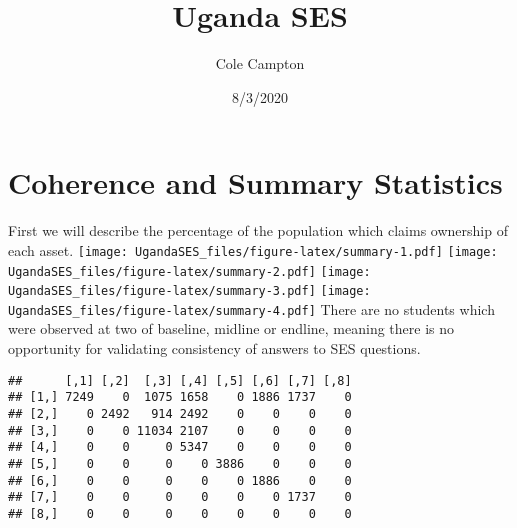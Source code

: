 \documentclass[
]{article}
\title{Uganda SES}
\author{Cole Campton}
\date{8/3/2020}
\newenvironment{Shaded}{\begin{snugshade}}{\end{snugshade}}
\newcommand{\ControlFlowTok}[1]{\textcolor[rgb]{0.13,0.29,0.53}{\textbf{#1}}}
\newcommand{\DataTypeTok}[1]{\textcolor[rgb]{0.13,0.29,0.53}{#1}}
\newcommand{\DecValTok}[1]{\textcolor[rgb]{0.00,0.00,0.81}{#1}}
\newcommand{\KeywordTok}[1]{\textcolor[rgb]{0.13,0.29,0.53}{\textbf{#1}}}
\newcommand{\NormalTok}[1]{#1}
\newcommand{\OperatorTok}[1]{\textcolor[rgb]{0.81,0.36,0.00}{\textbf{#1}}}
\newcommand{\StringTok}[1]{\textcolor[rgb]{0.31,0.60,0.02}{#1}}
\begin{document}
\maketitle

\hypertarget{coherence-and-summary-statistics}{%
\section{Coherence and Summary
Statistics}\label{coherence-and-summary-statistics}}

First we will describe the percentage of the population which claims
ownership of each asset.
\texttt{[image: UgandaSES\_files/figure-latex/summary-1.pdf]}
\texttt{[image: UgandaSES\_files/figure-latex/summary-2.pdf]}
\texttt{[image: UgandaSES\_files/figure-latex/summary-3.pdf]}
\texttt{[image: UgandaSES\_files/figure-latex/summary-4.pdf]} There are
no students which were observed at two of baseline, midline or endline,
meaning there is no opportunity for validating consistency of answers to
SES questions.

\begin{Shaded}
\end{Shaded}

\begin{verbatim}
##      [,1] [,2]  [,3] [,4] [,5] [,6] [,7] [,8]
## [1,] 7249    0  1075 1658    0 1886 1737    0
## [2,]    0 2492   914 2492    0    0    0    0
## [3,]    0    0 11034 2107    0    0    0    0
## [4,]    0    0     0 5347    0    0    0    0
## [5,]    0    0     0    0 3886    0    0    0
## [6,]    0    0     0    0    0 1886    0    0
## [7,]    0    0     0    0    0    0 1737    0
## [8,]    0    0     0    0    0    0    0    0
\end{verbatim}
\end{document}
